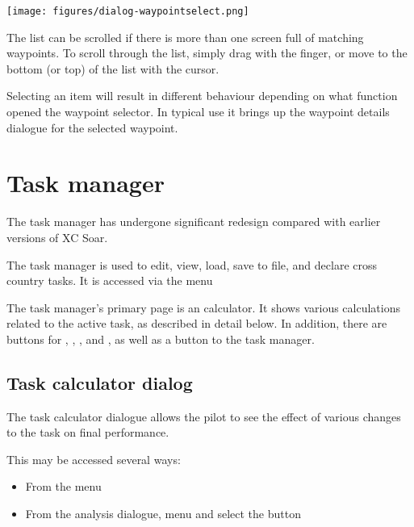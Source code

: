 \begin{center}
\texttt{[image: figures/dialog-waypointselect.png]}
\end{center}

The list can be scrolled if there is more than one screen full of
matching waypoints.  To scroll through the list, simply drag with the finger, or
move to the bottom (or top) of the list with the cursor.   

Selecting an item will result in different behaviour
depending on what function opened the waypoint selector.  In typical
use it brings up the waypoint details dialogue for the selected
waypoint.

\section{Task manager}\label{sec:task-manager-dialog}
\begin{it}  The task manager has undergone significant redesign compared with 
earlier versions of XC Soar.\end{it}

The task manager is used to edit, view, load, save to file, and declare cross
country tasks. It is accessed via the menu
\begin{quote}
\blink{}
\end{quote} 

The task manager's primary page is an calculator. It shows various calculations 
related to the active task, as described in detail below.  In addition, there 
are buttons for , , , 
and , as well as a button to  the task manager.

\subsection*{Task calculator dialog}\label{sec:task-calc-dial}
The task calculator dialogue allows the pilot to see the effect of
various changes to the task on final performance.

This may be accessed several ways: 
\begin{itemize}
\item From the menu 
\begin{quote}
\blink{}
\end{quote}
\item From the analysis dialogue, menu \blink{} and select
 the button 
\end{itemize}

